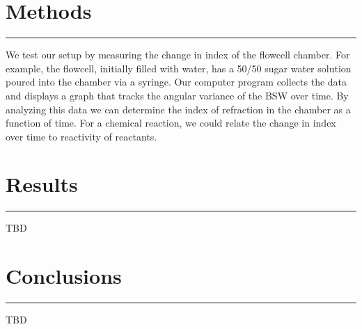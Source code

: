\documentclass{report}
\begin{document}
\begin{flushleft}
	\section*{Methods}
	\vspace{-0.1cm}\hrule\vspace{0.2cm}
	We test our setup by measuring the change in index of the flowcell chamber. For example, the flowcell, initially filled with water, has a 50/50 sugar water solution poured into the chamber via a syringe.	Our computer program collects the data and displays a graph that tracks the angular variance of the BSW over time. By analyzing this data we can determine the index of refraction in the chamber as a function of time. For a chemical reaction, we could relate the change in index over time to reactivity of reactants.
	\section*{Results}
	\vspace{-0.1cm}\hrule\vspace{0.2cm}
	TBD\\
	\section*{Conclusions}
	\vspace{-0.1cm}\hrule\vspace{0.2cm}
	TBD\\
	\end{flushleft}
\end{document}
